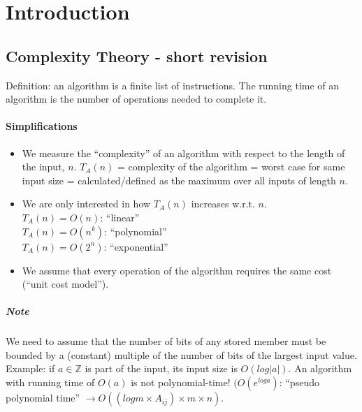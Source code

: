 \documentclass[main]{subfiles}
\begin{document}

\section{Introduction}

\subsection{Complexity Theory - short revision}
Definition: an algorithm is a finite list of instructions. The running time of
an algorithm is the number of operations needed to complete it.

\paragraph{Simplifications}
\begin{itemize}
\item We measure the ``complexity'' of an algorithm with respect to the length
of the input, $n$.
$T_{A}(n)$ = complexity of the algorithm = worst case for same input size =
calculated/defined as the maximum over all inputs of length $n$.

\item We are only interested in how $T_{A}(n)$ increases w.r.t. $n$. \\
$T_{A}(n) = O(n)$: ``linear'' \\
$T_{A}(n) = O(n^k)$: ``polynomial'' \\
$T_{A}(n) = O(2^n)$: ``exponential'' \\

\item We assume that every operation of the algorithm requires the same cost
(``unit cost model'').
\end{itemize}

\subparagraph{Note}
We need to assume that the number of bits of any stored member must be bounded
by a (constant) multiple of the number of bits of the largest input value.
Example: if $a \in \mathbb{Z}$ is part of the input, its input size is $O(log
|a|)$. An algorithm with running time of $O(a)$ is not polynomial-time!
$(O(e^{log a})$: ``pseudo polynomial time'' $\rightarrow O((log m \times
A_{ij}) \times m \times n)$.
\end{document}

